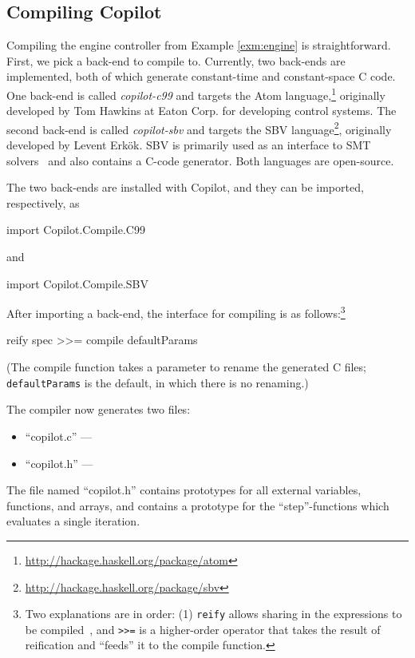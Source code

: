 \subsection{Compiling Copilot}  \label{sec:compiling}

Compiling the engine controller from Example \ref{exm:engine} is
straightforward.  First, we pick a back-end to compile to.  Currently, two
back-ends are implemented, both of which generate constant-time and
constant-space C code.  One back-end is called \emph{copilot-c99} and targets
the Atom language,\footnote{\url{http://hackage.haskell.org/package/atom}}
originally developed by Tom Hawkins at Eaton Corp. for developing control
systems.  The second back-end is called \emph{copilot-sbv} and targets the SBV
language\footnote{\url{http://hackage.haskell.org/package/sbv}}, originally
developed by Levent Erk\"{o}k.  SBV is primarily used as an interface to SMT
solvers~\cite{smt} and also contains a C-code generator.  Both
languages are open-source.

The two back-ends are installed with Copilot, and they can be imported,
respectively, as

\begin{code}
import Copilot.Compile.C99
\end{code}
\noindent
and
\begin{code}
import Copilot.Compile.SBV
\end{code}

After importing a back-end, the interface for compiling is as
follows:\footnote{Two explanations are in order: (1) {\tt reify} allows sharing in the expressions to be compiled~\cite{DSLExtract}, and {\tt >>=} is a higher-order
  operator that takes the result of reification and ``feeds'' it to the compile
  function.}
%
\begin{code}
reify spec >>= compile defaultParams
\end{code}
%
\noindent
(The compile function takes a parameter to rename the generated C files; {\tt
  defaultParams} is the default, in which there is no renaming.)

The compiler now generates two files:

\begin{itemize}
\item ``copilot.c'' --- 
\item ``copilot.h'' --- 
\end{itemize}

The file named ``copilot.h'' contains prototypes for all external variables, functions, and arrays,
and contains a prototype for the ``step''-functions which evaluates a single iteration.

